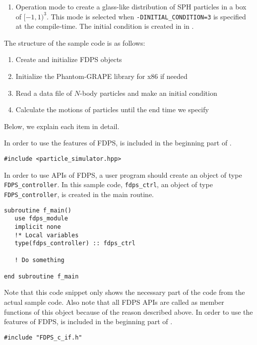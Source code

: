 \begin{enumerate}[leftmargin=*,itemsep=-1ex,label=(\alph*)]
\item Operation mode to create a glass-like distribution of SPH particles in a box of $[-1,1)^{3}$. This mode is selected when \texttt{-DINITIAL\_CONDITION=3} is specified at the compile-time. The initial condition is created in \procedure {} in .
\end{enumerate}


The structure of the sample code is as follows:
\begin{enumerate}[leftmargin=*,itemsep=-1ex,label=(\arabic*)]
\item Create and initialize FDPS objects
\item Initialize the Phantom-GRAPE library for x86 if needed
\item Read a data file of $N$-body particles and make an initial condition
\item Calculate the motions of particles until the end time we specify
\end{enumerate}

Below, we explain each item in detail.

\ifCpp %
In order to use the features of FDPS,  is included in the beginning part of .
\begin{lstlisting}[caption=Include the header file of FDPS]
#include <particle_simulator.hpp>
\end{lstlisting}
\endifCpp
\ifFtn %
In order to use APIs of FDPS, a user program should create an object of type \texttt{FDPS\_controller}.
In this sample code, \texttt{fdps\_ctrl}, an object of type \texttt{FDPS\_controller}, is created in the main routine.
\begin{lstlisting}[caption=Creation of an object of type \texttt{fdps\_controller}]
subroutine f_main()
   use fdps_module
   implicit none
   !* Local variables
   type(fdps_controller) :: fdps_ctrl
    
   ! Do something
   
end subroutine f_main    
\end{lstlisting}
Note that this code snippet only shows the necessary part of the code from the actual sample code. Also note that all FDPS APIs are called as member functions of this object because of the reason described above.
\endifFtn
\ifC %
In order to use the features of FDPS,  is included in the beginning part of .
\begin{lstlisting}[caption=Include the header file of FDPS C interface]
#include "FDPS_c_if.h"
\end{lstlisting}
\endifC


